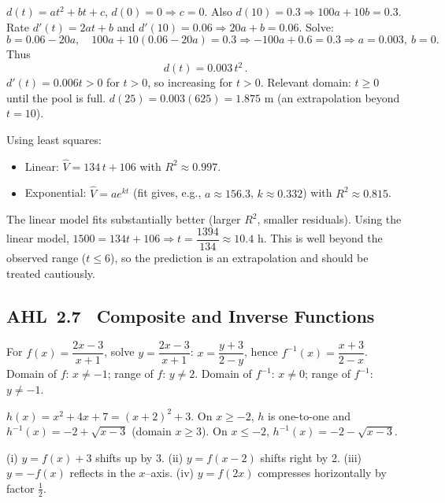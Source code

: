\documentclass[11pt]{article}
\newcommand{\tocsubsection}[1]{\subsection{#1}}
\begin{document}
\begin{solution}
$d(t)=at^2+bt+c$, $d(0)=0\Rightarrow c=0$. Also $d(10)=0.3\Rightarrow 100a+10b=0.3$.
Rate $d'(t)=2at+b$ and $d'(10)=0.06\Rightarrow 20a+b=0.06$.
Solve:
\[
b=0.06-20a,\quad 100a+10(0.06-20a)=0.3\Rightarrow -100a+0.6=0.3\Rightarrow a=0.003,\ b=0.
\]
Thus
\[
\boxed{\,d(t)=0.003\,t^2\,}.
\]
$d'(t)=0.006t>0$ for $t>0$, so increasing for $t>0$. Relevant domain: $t\ge 0$ until the pool is full.
$d(25)=0.003(625)=\boxed{1.875\text{ m}}$ (an extrapolation beyond $t=10$).
\end{solution}

\begin{solution}
Using least squares:
\begin{itemize}
\item Linear: $\displaystyle \boxed{\hat V=134\,t+106}$ with $R^2\approx \boxed{0.997}$.
\item Exponential: $\hat V=a e^{kt}$ (fit gives, e.g., $a\approx 156.3$, $k\approx 0.332$) with $R^2\approx \boxed{0.815}$.
\end{itemize}
The linear model fits substantially better (larger $R^2$, smaller residuals).  
Using the linear model, $1500=134t+106\Rightarrow t=\dfrac{1394}{134}\approx \boxed{10.4\text{ h}}$.  
This is well beyond the observed range ($t\le 6$), so the prediction is an extrapolation and should be treated cautiously.
\end{solution}




\tocsubsection{AHL 2.7 \; Composite and Inverse Functions}

\begin{solution}
For $f(x)=\dfrac{2x-3}{x+1}$, solve $y=\dfrac{2x-3}{x+1}$:
$x=\dfrac{y+3}{2-y}$, hence $f^{-1}(x)=\dfrac{x+3}{2-x}$.
Domain of $f$: $x\ne-1$; range of $f$: $y\ne2$.
Domain of $f^{-1}$: $x\ne 0$; range of $f^{-1}$: $y\ne -1$.
\end{solution}

\begin{solution}
$h(x)=x^2+4x+7=(x+2)^2+3$.  On $x\ge -2$, $h$ is one-to-one and
$h^{-1}(x)=-2+\sqrt{x-3}$ (domain $x\ge3$).  On $x\le -2$, $h^{-1}(x)=-2-\sqrt{x-3}$.
\end{solution}

\begin{solution}
(i) $y=f(x)+3$ shifts up by 3. (ii) $y=f(x-2)$ shifts right by 2.
(iii) $y=-f(x)$ reflects in the $x$–axis. (iv) $y=f(2x)$ compresses horizontally by factor $\tfrac12$.
\end{solution}
\end{document}
